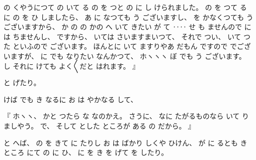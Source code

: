 の
%
くやうにつて
の
いて
る
の
を
つと%
の
に
し
けられました。
%
の
を
つて
る
に
の
を
ひ
しましたら、
%
あ
に
なつても
う
ございますし、
%
を
かなくつても
う
ございますから、
%
か
の
の
かの
%
へ
いて
きたい
が
て
‥‥
せ
も
ませんので
には
ちませんし、
%
ですから、
%
いては
さいますまいつて、
%
それで
つい、
%
いて
つた
といふので
ございます。
%
ほんとに
いて
ますりやあ
だもん
ですので
でございますが、
%
に
でも
なりたい
なんかつて、
%
ホヽヽヽ
ぼ
でも
う
ございます。
%
し
それに
けても
よく〳〵だと
はれます。
』

%
と
げたり。

%
けば
でも
き
なるに
お
は
やかなる
して、

%
『
ホヽヽ、
%
かと
つたら
な
なのかえ。
%
さうに、
%
なに
たがるものなら
いて
りましやう。
%
で、%
%
そして
とした
ところが
ある
の
だから。
』

%
と
へば、
%
の
を
きて
に
たりし
お
は
ばかり
しくや
ひけん、
%
が
に
るとも
き
ところ
にて
の
に
ひ、
%
に
を
き
を
げて
を
したり。

